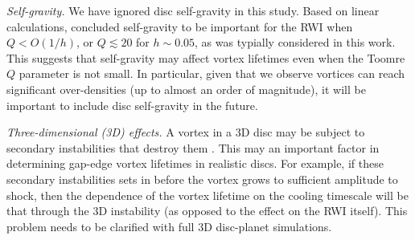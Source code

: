 \emph{Self-gravity.} We have ignored disc self-gravity in this study. Based on linear calculations, \cite{lovelace13} concluded self-gravity
to be important for the RWI when $Q<O(1/h)$, or $Q\lesssim 20$ for $h\sim0.05$, as was typially considered in this work. This suggests that 
self-gravity may affect vortex lifetimes even when the Toomre $Q$ parameter is not small. In particular, given that we observe
vortices can reach significant over-densities (up to almost an order of magnitude), it will be important to include disc self-gravity 
in the future. %
 
\emph{Three-dimensional (3D) effects.} A vortex in a 3D disc may be subject to secondary instabilities 
that destroy them \citep{lesur09,railton14}. This may an important factor in determining gap-edge vortex lifetimes
in realistic discs. For example, if these secondary instabilities sets in before the vortex grows to sufficient amplitude to shock, 
then the dependence of the vortex lifetime on the cooling timescale will be that through the 3D instability (as opposed to the effect on the RWI itself).  
This problem needs to be clarified with full 3D disc-planet simulations. 

